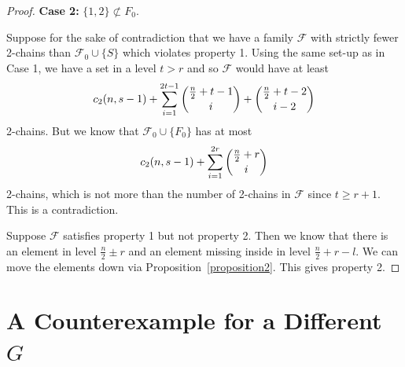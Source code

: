 \documentclass[12pt]{article}
\theoremstyle{plain}
\theoremstyle{definition}
\theoremstyle{remark}
\newcommand{\F}{\mathcal{F}}
\begin{document}
\begin{proof}

\textbf{Case 2:} $\{ 1, 2\} \not\subset F_0$.

Suppose for the sake of contradiction that we have a family $\F$ with strictly fewer 2-chains than $\F_0 \cup \{S\}$ which violates property 1. Using the same set-up as in Case 1, we have a set in a level $t > r$ and so $\F$ would have at least
\[ c_2(n, s-1) + \sum_{i=1}^{2t-1} \dbinom{\frac{n}{2}+t-1}{i} + \dbinom{\frac{n}{2}+t-2}{i-2} \]
2-chains.
But we know that $\F_0 \cup \{ F_0\}$ has at most
\[ c_2(n,s-1) + \sum_{i=1}^{2r} \dbinom{\frac{n}{2}+r}{i} \]
2-chains, which is not more than the number of 2-chains in $\F$ since $t \geq r + 1$. This is a contradiction.

Suppose $\F$ satisfies property 1 but not property 2. Then we know that there is an element in level $\frac{n}{2} \pm r$ and an element missing inside in level $\frac{n}{2}+r-l$. We can move the elements down via Proposition~\ref{proposition2}. This gives property 2. 
\end{proof}

\section{A Counterexample for a Different $G$}
\end{document}
